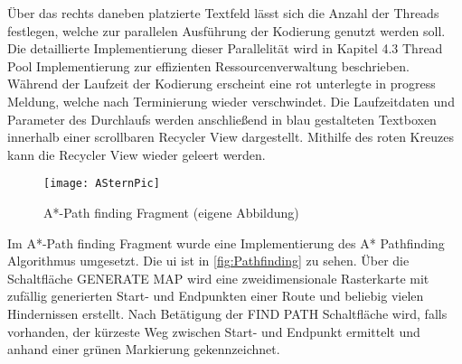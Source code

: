 Über das rechts daneben platzierte Textfeld lässt sich die Anzahl der Threads festlegen, welche zur parallelen Ausführung der Kodierung genutzt werden soll. Die detaillierte Implementierung dieser Parallelität wird in Kapitel 4.3 \glqq Thread Pool Implementierung zur effizienten Ressourcenverwaltung\grqq{} beschrieben. Während der Laufzeit der Kodierung erscheint eine rot unterlegte \glqq in progress\grqq{} Meldung, welche nach Terminierung wieder verschwindet. Die Laufzeitdaten und Parameter des Durchlaufs werden anschließend in blau gestalteten Textboxen innerhalb einer scrollbaren Recycler View dargestellt. Mithilfe des roten Kreuzes kann die Recycler View wieder geleert werden.
\begin{figure}[H]
\begin{center}
	\texttt{[image: ASternPic]}
	\caption{A*-Path finding Fragment (eigene Abbildung)}
	\label{fig:Pathfinding} 
\end{center}
\end{figure}
Im A*-Path finding Fragment wurde eine Implementierung des A* Pathfinding Algorithmus umgesetzt. Die \ac{ui} ist in \autoref{fig:Pathfinding} zu sehen. Über die Schaltfläche \glqq GENERATE MAP\grqq{} wird eine zweidimensionale Rasterkarte mit zufällig generierten Start- und Endpunkten einer Route und beliebig vielen Hindernissen erstellt. Nach Betätigung der \glqq FIND PATH\grqq{} Schaltfläche wird, falls vorhanden, der kürzeste Weg zwischen Start- und Endpunkt ermittelt und anhand einer grünen Markierung gekennzeichnet.

